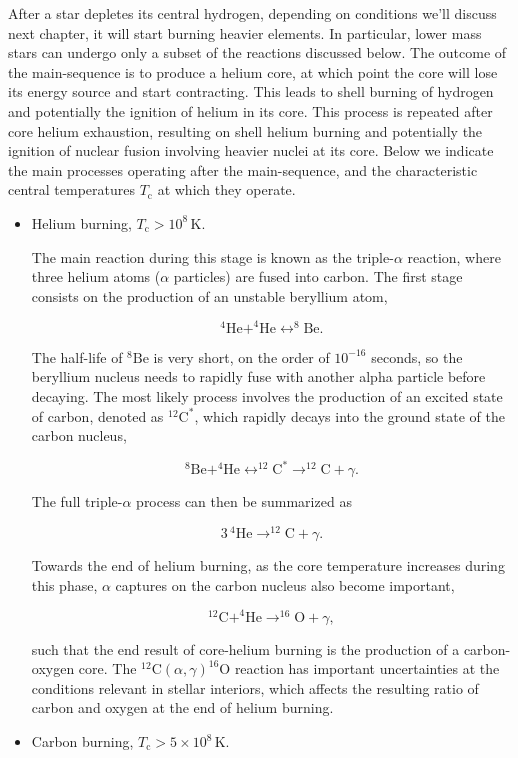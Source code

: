 \documentclass[twocolumn]{article}
\begin{document}
After a star depletes its central hydrogen, depending on conditions
we'll discuss next chapter, it will start burning heavier elements. In
particular, lower mass stars can undergo only a subset of the reactions
discussed below. The outcome of the main-sequence is to produce a helium
core, at which point the core will lose its energy source and start
contracting. This leads to shell burning of hydrogen and potentially the
ignition of helium in its core. This process is repeated after core
helium exhaustion, resulting on shell helium burning and potentially the
ignition of nuclear fusion involving heavier nuclei at its core. Below
we indicate the main processes operating after the main-sequence, and
the characteristic central temperatures \(T_\mathrm{c}\) at which they
operate.

\begin{itemize}
\item
  Helium burning, \(T_\mathrm{c}>10^8\,\mathrm{K}\).

  The main reaction during this stage is known as the triple-\(\alpha\)
  reaction, where three helium atoms (\(\alpha\) particles) are fused
  into carbon. The first stage consists on the production of an unstable
  beryllium atom,

  \[^4\mathrm{He}+^4\mathrm{He}\leftrightarrow ^8\mathrm{Be}.\]

  The half-life of \(^8\mathrm{Be}\) is very short, on the order of
  \(10^{-16}\) seconds, so the beryllium nucleus needs to rapidly fuse
  with another alpha particle before decaying. The most likely process
  involves the production of an excited state of carbon, denoted as
  \(^{12}\mathrm{C}^*\), which rapidly decays into the ground state of
  the carbon nucleus,

  \[^8\mathrm{Be}+^4\mathrm{He}\leftrightarrow ^{12}\mathrm{C}^*\rightarrow ^{12}\mathrm{C}+\gamma.\]

  The full triple-\(\alpha\) process can then be summarized as

  \[3\,{^4}\mathrm{He}\rightarrow ^{12}\mathrm{C}+\gamma.\]

  Towards the end of helium burning, as the core temperature increases
  during this phase, \(\alpha\) captures on the carbon nucleus also
  become important,

  \[^{12}\mathrm{C}+^{4}\mathrm{He}\rightarrow ^{16}\mathrm{O}+\gamma,\]

  such that the end result of core-helium burning is the production of a
  carbon-oxygen core. The
  \(^{12}\mathrm{C}(\alpha,\gamma)^{16}\mathrm{O}\) reaction has
  important uncertainties at the conditions relevant in stellar
  interiors, which affects the resulting ratio of carbon and oxygen at
  the end of helium burning.
\item
  Carbon burning, \(T_\mathrm{c}>5\times 10^8\,\mathrm{K}.\)


\end{itemize}
\end{document}
